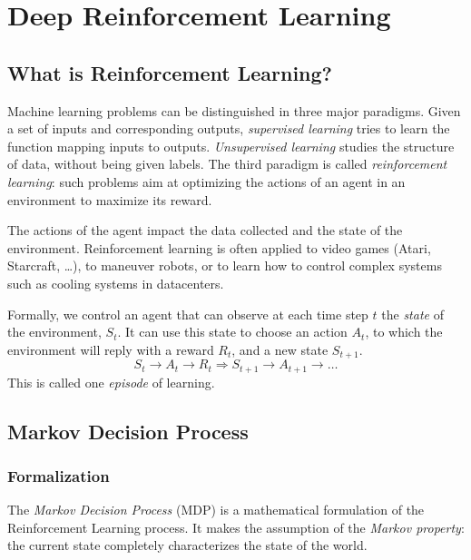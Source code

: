 \section{Deep Reinforcement Learning}
\subsection{What is Reinforcement Learning?}
Machine learning problems can be distinguished in three major paradigms. Given a set of inputs and corresponding outputs, \emph{supervised learning} tries to learn the function mapping inputs to outputs. \emph{Unsupervised learning} studies the structure of data, without being given labels. The third paradigm is called \emph{reinforcement learning}: such problems aim at optimizing the actions of an agent in an environment to maximize its reward.

The actions of the agent impact the data collected and the state of the environment. Reinforcement learning is often applied to video games (Atari, Starcraft, \dots), to maneuver robots, or to learn how to control complex systems such as cooling systems in datacenters.

Formally, we control an agent that can observe at each time step $t$ the \emph{state} of the environment, $S_t$. It can use this state to choose an action $A_t$, to which the environment will reply with a reward $R_t$, and a new state $S_{t+1}$.
\begin{equation*}
    S_t\longrightarrow A_t\longrightarrow R_t \Longrightarrow S_{t+1}\longrightarrow A_{t+1} \longrightarrow \dots
\end{equation*}
This is called one \emph{episode} of learning.

\subsection{Markov Decision Process}
\subsubsection{Formalization}
The \emph{Markov Decision Process} (MDP) is a mathematical formulation of the Reinforcement Learning process. It makes the assumption of the \emph{Markov property}: the current state completely characterizes the state of the world.

